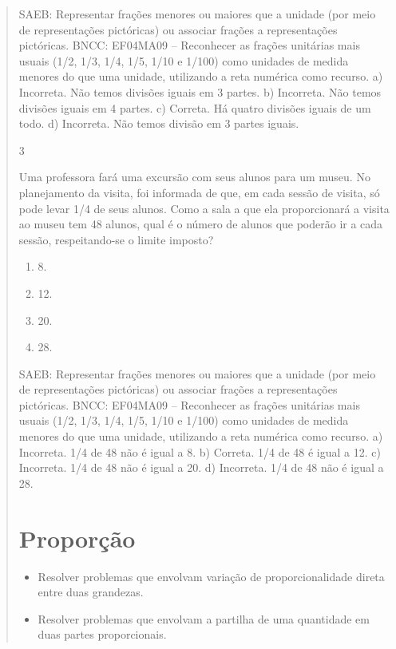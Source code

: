 \begin{mdframed}[linewidth=2pt,linecolor=salmao,roundcorner=2pt]
\begin{itemize}
{\begin{itemize}
\begin{escolha}
{\begin{quote}
{\begin{escolha}
{{{{SAEB: Representar frações menores ou maiores que a unidade (por meio de representações
pictóricas) ou associar frações a representações pictóricas.
BNCC: EF04MA09 -- Reconhecer as frações unitárias mais usuais (1/2, 1/3, 1/4, 1/5, 1/10 e 1/100) como
unidades de medida menores do que uma unidade, utilizando a reta numérica como recurso.
a)  Incorreta. Não temos divisões iguais em 3 partes.
b)  Incorreta. Não temos divisões iguais em 4 partes.
c)  Correta. Há quatro divisões iguais de um todo.
d)  Incorreta. Não temos divisão em 3 partes iguais.


\num{3}

Uma professora fará uma excursão com seus alunos para um museu. No
planejamento da visita, foi informada de que, em cada sessão de visita, só
pode levar 1/4 de seus alunos. Como a sala a que ela proporcionará a
visita ao museu tem 48 alunos, qual é o número de alunos que poderão ir a
cada sessão, respeitando-se o limite imposto?

\begin{enumerate}
\item
  8.
\item
  12.
\item
  20.
\item
  28.
\end{enumerate}

SAEB: Representar frações menores ou maiores que a unidade (por meio de representações
pictóricas) ou associar frações a representações pictóricas.
BNCC: EF04MA09 -- Reconhecer as frações unitárias mais usuais (1/2, 1/3, 1/4, 1/5, 1/10 e 1/100) como
unidades de medida menores do que uma unidade, utilizando a reta numérica como recurso.
a)  Incorreta. 1/4 de 48 não é igual a 8.
b)  Correta. 1/4 de 48 é igual a 12.
c)  Incorreta. 1/4 de 48 não é igual a 20.
d)  Incorreta. 1/4 de 48 não é igual a 28.

\chapter{Proporção}


\begin{itemize}
\item Resolver problemas que envolvam variação de proporcionalidade direta
entre duas grandezas.
\item Resolver problemas que envolvam a partilha de uma quantidade em duas
partes proporcionais.
\end{itemize}

}}}}
\end{escolha}}
\end{quote}}
\end{escolha}
\end{itemize}}
\end{itemize}
\end{mdframed}
